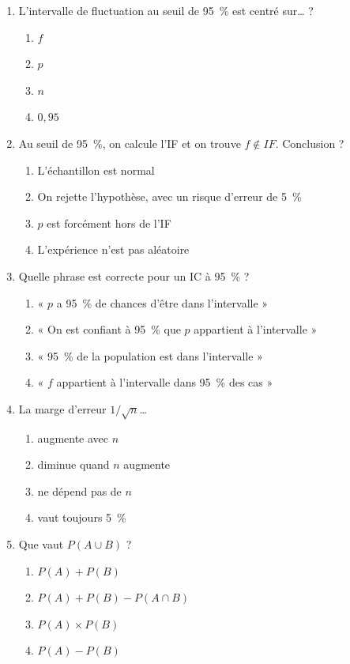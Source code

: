 \documentclass[11pt,a4paper]{article}
\newcommand{\IF}{\textit{IF}}
\begin{document}
\begin{enumerate}[leftmargin=*, label=\textbf{Q\arabic*.}]
		\item L'intervalle de fluctuation au seuil de 95~\% est centré sur… ?
		\begin{enumerate}[label=(\alph*)]
			\item $f$
			\item $p$
			\item $n$
			\item $0{,}95$
		\end{enumerate}
		
		\item Au seuil de 95~\%, on calcule l'IF et on trouve $f \notin \IF{}$.
		Conclusion ?
		\begin{enumerate}[label=(\alph*)]
			\item L'échantillon est normal
			\item On rejette l'hypothèse, avec un risque d'erreur de 5~\%
			\item $p$ est forcément hors de l'IF
			\item L'expérience n'est pas aléatoire
		\end{enumerate}
		
		\item Quelle phrase est correcte pour un IC à 95~\% ?
		\begin{enumerate}[label=(\alph*)]
			\item « $p$ a 95~\% de chances d'être dans l'intervalle »
			\item « On est confiant à 95~\% que $p$ appartient à l'intervalle »
			\item « 95~\% de la population est dans l'intervalle »
			\item « $f$ appartient à l'intervalle dans 95~\% des cas »
		\end{enumerate}
		
		\item La marge d'erreur $1/\sqrt{n}$…
		\begin{enumerate}[label=(\alph*)]
			\item augmente avec $n$
			\item diminue quand $n$ augmente
			\item ne dépend pas de $n$
			\item vaut toujours 5~\%
		\end{enumerate}
		
		\item Que vaut $P\left(A \cup B\right)$ ?
		\begin{enumerate}[label=(\alph*)]
			\item $P\left(A\right) + P\left(B\right)$
			\item $P\left(A\right) + P\left(B\right) - P\left(A \cap B\right)$
			\item $P\left(A\right) \times P\left(B\right)$
			\item $P\left(A\right) - P\left(B\right)$
		\end{enumerate}
	\end{enumerate}
	
\end{document}
